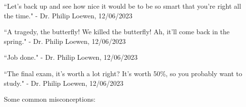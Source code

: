 \begin{nquote}{}
	``Let's back up and see how nice it would be to be so smart that you're right all the time." - Dr. Philip Loewen, 12/06/2023
	
	\medskip
	
	``A tragedy, the butterfly! We killed the butterfly! Ah, it'll come back in the spring." - Dr. Philip Loewen, 12/06/2023
	
	\medskip
	
	``Job done." - Dr. Philip Loewen, 12/06/2023
	
	\medskip
	
	``The final exam, it's  worth a lot right? It's worth 50\%, so you probably want to study." - Dr. Philip Loewen, 12/06/2023
\end{nquote}

Some common misconceptions:

